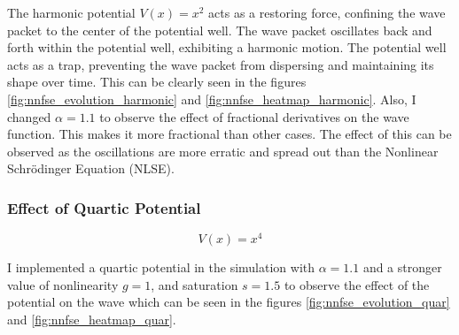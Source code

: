 \documentclass[8pt, a4paper, twocolumn]{article}
\begin{document}
The harmonic potential $V(x) = x^2$ acts as a restoring force, confining the wave packet to the
center of the potential well. The wave packet oscillates back and forth within the potential well,
exhibiting a harmonic motion. The potential well acts as a trap, preventing the wave packet from
dispersing and maintaining its shape over time. This can be clearly seen in the figures \ref{fig:nnfse_evolution_harmonic} and
\ref{fig:nnfse_heatmap_harmonic}. Also, I changed $\alpha = 1.1$ to observe the effect of
fractional derivatives on the wave function. This makes it more fractional than other cases. The effect of this
can be observed as the oscillations are more erratic and spread out than the Nonlinear Schrödinger Equation (NLSE).


\subsubsection{Effect of Quartic Potential}

\begin{equation}
	V(x) = x^4
\end{equation}

I implemented a quartic potential in the simulation with $\alpha = 1.1$ and a stronger value of nonlinearity $g = 1$, 
and saturation $s = 1.5$ to observe the effect of the potential on the wave which can be seen in 
the figures \ref{fig:nnfse_evolution_quar} and \ref{fig:nnfse_heatmap_quar}.\\
\end{document}
